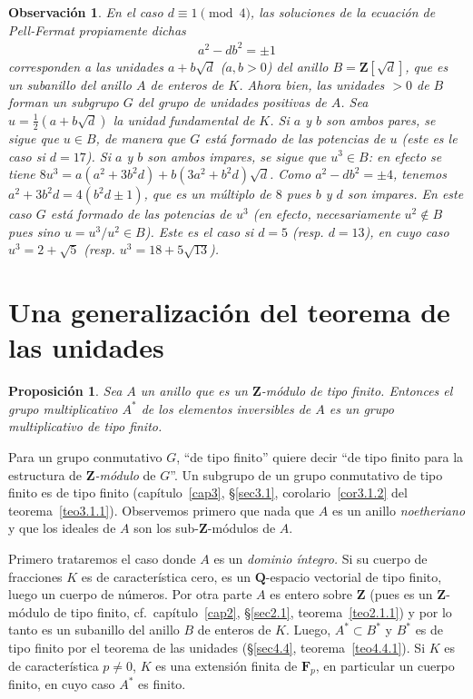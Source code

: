 \documentclass[bibtotoc,leqno,spanish]{amsbook}
\newcommand{\QQ}{\mathbf{Q}}
\newcommand{\ZZ}{\mathbf{Z}}
\newcommand{\FF}{\mathbf{F}}
\numberwithin{equation}{section}
\newenvironment{comm}%
	{\begin{quotation}\itshape\Small}
	{\end{quotation}}
\theoremstyle{note}
\theoremstyle{note}
\newtheorem{proposition}{Proposici\'on}
\theoremstyle{rem}
\newtheorem*{remark*}{Observaci\'on}
\numberwithin{theorem}{section}
\numberwithin{proposition}{section}
\numberwithin{definition}{section}
\numberwithin{lemma}{section}
\numberwithin{corollary}{section}
\numberwithin{example}{section}
\numberwithin{footnote}{section}%
\begin{document}
\begin{remark*}
En el caso $d\equiv 1\pmod 4$, las soluciones de la ecuaci\'on de Pell-Fermat propiamente dichas
\begin{gather}
a^{2}-db^{2}=\pm 1
\end{gather}
corresponden a las unidades $a+b\sqrt{d}$ ($a,b>0$) del anillo $B=\ZZ[\sqrt{d}]$, que es un subanillo
del anillo $A$ de enteros de $K$. Ahora bien, las unidades $>0$ de $B$ forman un subgrupo $G$ del grupo de
unidades positivas de $A$. Sea $u=\frac{1}{2}(a+b\sqrt{d})$ la unidad fundamental de $K$. Si $a$ y $b$ son
ambos {\em pares,} se sigue que $u\in B$, de manera que $G$ {\em est\'a formado de las potencias de $u$} (este
es le caso si $d=17$). Si $a$ y $b$ son ambos {\em impares, se sigue que $u^{3}\in B$:} en efecto se
tiene $8u^{3}=a(a^{2}+3b^{2}d)+b(3a^{2}+b^{2}d)\sqrt{d}$. Como $a^{2}-db^{2}=\pm 4$, tenemos
$a^{2}+3b^{2}d=4(b^{2}d\pm 1)$, que es un m\'ultiplo de $8$ pues $b$ y $d$ son impares. En este caso $G$
{\em est\'a formado de las potencias de $u^{3}$} (en efecto, necesariamente $u^{2}\notin B$ pues sino
$u=u^{3}/u^{2}\in B$). Este es el caso si $d=5$ (resp. $d=13$), en cuyo caso $u^{3}=2+\sqrt{5}$
(resp. $u^{3}=18+5\sqrt{13}$).
\end{remark*}

\section{Una generalizaci\'on del teorema de las unidades}

\begin{proposition}
Sea $A$ un anillo que es un $\ZZ$-m\'odulo de tipo finito. Entonces el grupo multiplicativo
$A^{*}$ de los elementos inversibles de $A$ es un grupo multiplicativo de tipo finito.
\end{proposition}

Para un grupo conmutativo $G$, ``de tipo finito'' quiere decir ``de tipo finito para la estructura
de {\em $\ZZ$-m\'odulo} de $G$''. Un subgrupo de un grupo conmutativo de tipo finito es de tipo finito
(cap\'itulo~\ref{cap3}, \S\ref{sec3.1}, corolario~\ref{cor3.1.2} del teorema~\ref{teo3.1.1}).
Observemos primero que nada que $A$ es un anillo {\em noetheriano}
y que los ideales de $A$ son los sub-$\ZZ$-m\'odulos de $A$.

Primero trataremos el caso donde $A$ es un {\em dominio \'integro.} Si su cuerpo de fracciones $K$ es
de caracter\'istica cero, es un $\QQ$-espacio vectorial de tipo finito, luego un cuerpo de n\'umeros.
Por otra parte $A$ es entero sobre $\ZZ$ (pues es un $\ZZ$-m\'odulo de tipo finito,
cf.~cap\'itulo~\ref{cap2}, \S\ref{sec2.1}, teorema~\ref{teo2.1.1})
y por lo tanto es un subanillo del anillo $B$ de enteros de $K$. Luego, $A^{*}\subset B^{*}$ y $B^{*}$ es
de tipo finito por el teorema de las unidades (\S\ref{sec4.4}, teorema~\ref{teo4.4.1}). Si $K$ es de caracter\'istica $p\neq 0$, $K$
es una extensi\'on finita de $\FF_{p}$, en particular un cuerpo finito, en cuyo caso $A^{*}$ es finito.
\end{document}
